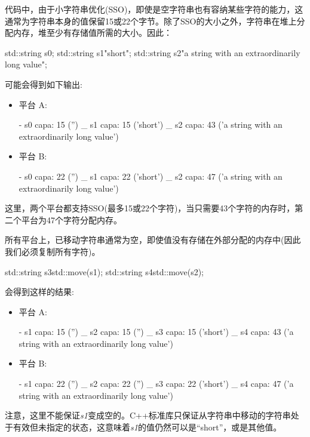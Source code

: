 代码中，由于小字符串优化(SSO)，即使是空字符串也有容纳某些字符的能力，这通常为字符串本身的值保留15或22个字节。除了SSO的大小之外，字符串在堆上分配内存，堆至少有存储值所需的大小。因此：

\begin{cppcode}
std::string s0;
std::string s1{"short"};
std::string s2{"a string with an extraordinarily long value"};
\end{cppcode}

可能会得到如下输出:

\begin{itemize}
	\item 平台 A:
	\begin{shell}
	- s0 capa: 15 ('') _
	s1 capa: 15 ('short') _
	s2 capa: 43 ('a string with an extraordinarily long value')
	\end{shell}	
	\item 平台 B:
	\begin{shell}
	- s0 capa: 22 ('') _
	s1 capa: 22 ('short') _
	s2 capa: 47 ('a string with an extraordinarily long value')
	\end{shell}	
\end{itemize}

这里，两个平台都支持SSO(最多15或22个字符)，当只需要43个字符的内存时，第二个平台为47个字符分配内存。

所有平台上，已移动字符串通常为空，即使值没有存储在外部分配的内存中(因此我们必须复制所有字符)。

\begin{cppcode}
std::string s3{std::move(s1)};
std::string s4{std::move(s2)};
\end{cppcode}

会得到这样的结果:

\begin{itemize}
	\item 平台 A:
	\begin{shell}
	- s1 capa: 15 ('') _
	s2 capa: 15 ('') _
	s3 capa: 15 ('short') _
	s4 capa: 43 ('a string with an extraordinarily long value')
	\end{shell}	
	\item 平台 B:
	\begin{shell}
	- s1 capa: 22 ('') _
	s2 capa: 22 ('') _
	s3 capa: 22 ('short') _
	s4 capa: 47 ('a string with an extraordinarily long value')
	\end{shell}	
\end{itemize}

注意，这里不能保证\textit{s1}变成空的。C++标准库只保证从字符串中移动的字符串处于有效但未指定的状态，这意味着\textit{s1}的值仍然可以是“short”，或是其他值。

